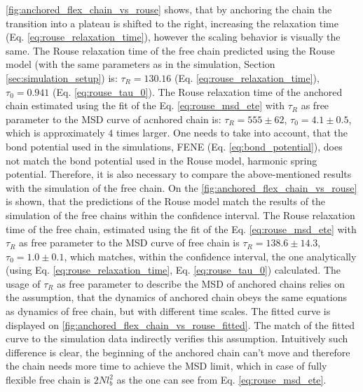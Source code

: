 \documentclass[
    paper=A4,pagesize=automedia,fontsize=12pt,
    BCOR=15mm,DIV=22,
    twoside,headinclude,footinclude=false,
    fleqn,             %
    bibliography=totocnumbered,          %
    listof=totoc,                %
    listof=flat,                 %
    cleardoublepage=empty      %
    numbers=endperiod
]{scrartcl}
\begin{document}
\autoref{fig:anchored_flex_chain_vs_rouse} shows, that by anchoring the chain
the transition into a plateau is shifted to the right, increasing the 
relaxation time (Eq. \ref{eq:rouse_relaxation_time}), 
however the scaling behavior is visually the same. The Rouse relaxation time
of the free chain predicted using the Rouse model 
(with the same parameters as in the simulation, Section \ref{sec:simulation_setup})
is: $\tau_R=130.16$ (Eq. \ref{eq:rouse_relaxation_time}), 
$\tau_0=0.941$ (Eq. \ref{eq:rouse_tau_0}).
The Rouse relaxation time of the anchored chain estimated 
using the fit of the Eq. \ref{eq:rouse_msd_ete} with $\tau_R$ as free parameter
to the MSD curve of acnhored chain is: 
$\tau_R=555 \pm 62$, $\tau_0=4.1 \pm 0.5$, which is approximately $4$ times
larger. One needs to take into account, that the bond potential used in the simulations, 
FENE (Eq. \ref{eq:bond_potential}), does not match the bond potential 
used in the Rouse model, harmonic spring potential. Therefore, it is also 
necessary to compare the above-mentioned results with the simulation of the free chain.
On the \autoref{fig:anchored_flex_chain_vs_rouse} is shown, that the predictions
of the Rouse model match the results of the simulation of the free chains within the
confidence interval. The Rouse relaxation time of the free chain, estimated 
using the fit of the Eq. \ref{eq:rouse_msd_ete} with $\tau_R$ as free parameter
to the MSD curve of free chain is $\tau_R=138.6 \pm 14.3$, $\tau_0=1.0 \pm 0.1$,
which matches, within the confidence interval, the one analytically 
(using Eq. \ref{eq:rouse_relaxation_time}, Eq. \ref{eq:rouse_tau_0}) calculated.
The usage of $\tau_R$ as free parameter to describe the MSD of anchored chains 
relies on the assumption, that
the dynamics of anchored chain obeys the same equations as dynamics of free chain, 
but with different time scales. The fitted curve is displayed on
\autoref{fig:anchored_flex_chain_vs_rouse_fitted}. The match of 
the fitted curve to the simulation data indirectly verifies this assumption.
Intuitively such difference is clear, the beginning of the anchored chain
can't move and therefore the chain needs more time to achieve the MSD limit, which
in case of fully flexible free chain is $2Nl_b^2$ as the one can see from Eq. \ref{eq:rouse_msd_ete}. 
\end{document}
